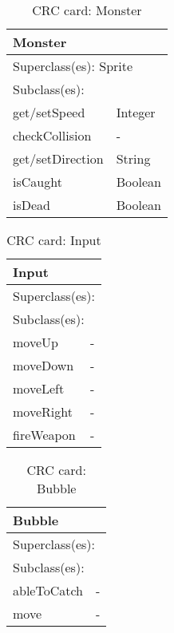 \begin{table}[]
\centering
\label{crc_monster}
\begin{tabular}{|l|l|}
\hline
\multicolumn{2}{|l|}{Monster} \\ \hline
\multicolumn{2}{|l|}{Superclass(es): Sprite} \\ \hline
\multicolumn{2}{|l|}{Subclass(es):} \\ \hline
get/setSpeed            & Integer \\ \hline
checkCollision          & -\\ \hline
get/setDirection        & String\\ \hline
isCaught                & Boolean \\ \hline
isDead                  & Boolean \\ \hline
\end{tabular}
\caption{CRC card: Monster}
\end{table}

\begin{table}[]
\centering
\label{crc_input}
\begin{tabular}{|l|l|}
\hline
\multicolumn{2}{|l|}{Input} \\ \hline
\multicolumn{2}{|l|}{Superclass(es):} \\ \hline
\multicolumn{2}{|l|}{Subclass(es):} \\ \hline
moveUp          & -\\ \hline
moveDown        & - \\ \hline
moveLeft        & -\\ \hline
moveRight       & -\\ \hline
fireWeapon      & - \\ \hline
\end{tabular}
\caption{CRC card: Input}
\end{table}

\begin{table}[]
\centering
\label{crc_bubble}
\begin{tabular}{|l|l|}
\hline
\multicolumn{2}{|l|}{Bubble} \\ \hline
\multicolumn{2}{|l|}{Superclass(es):} \\ \hline
\multicolumn{2}{|l|}{Subclass(es):} \\ \hline
ableToCatch           & - \\ \hline
move           & -\\ \hline
\end{tabular}
\caption{CRC card: Bubble}
\end{table}

